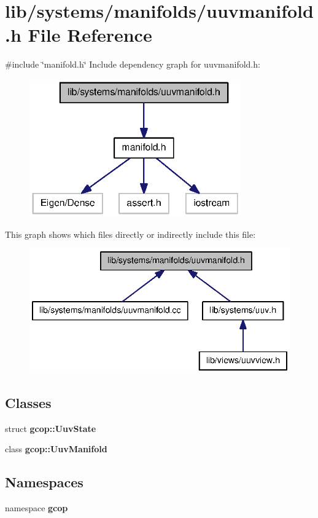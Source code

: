 \section{lib/systems/manifolds/uuvmanifold.h \-File \-Reference}
\label{uuvmanifold_8h}
{\ttfamily \#include \char`\"{}manifold.\-h\char`\"{}}\*
\-Include dependency graph for uuvmanifold.\-h\-:
\nopagebreak
\begin{figure}[H]
\begin{center}
\leavevmode
\includegraphics[width=258pt]{uuvmanifold_8h__incl}
\end{center}
\end{figure}
\-This graph shows which files directly or indirectly include this file\-:
\nopagebreak
\begin{figure}[H]
\begin{center}
\leavevmode
\includegraphics[width=340pt]{uuvmanifold_8h__dep__incl}
\end{center}
\end{figure}
\subsection*{\-Classes}
\begin{DoxyCompactItemize}
\item 
struct {\bf gcop\-::\-Uuv\-State}
\item 
class {\bf gcop\-::\-Uuv\-Manifold}
\end{DoxyCompactItemize}
\subsection*{\-Namespaces}
\begin{DoxyCompactItemize}
\item 
namespace {\bf gcop}
\end{DoxyCompactItemize}
